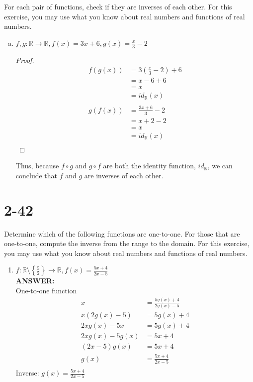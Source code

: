 \documentclass{article}
\newcommand{\R}{\mathbb{R}}
\begin{document}
For each pair of functions, check if they are inverses of each other.  For this
exercise, you may use what you know about real numbers and functions of real
numbers.

\begin{enumerate}[a)]
    \item $f, g : \R \to \R, f(x) = 3x + 6, g(x) = \frac{x}{3} - 2$
        \begin{proof}
            \begin{align*}
                f(g(x)) &= 3(\frac{x}{3} - 2) + 6 \\
                        &= x - 6 + 6 \\
                        &= x \\
                        &= id_\R(x) \\
                \\
                g(f(x)) &= \frac{3x + 6}{3} - 2 \\
                        &= x + 2 - 2 \\
                        &= x \\
                        &= id_\R(x) \\
            \end{align*}
        \end{proof}
        Thus, because $f \circ g$ and $g \circ f$ are both the identity
        function, $id_\R$, we can conclude that $f$ and $g$ are inverses of
        each other.
\end{enumerate}

\section{2-42}

Determine which of the following functions are one-to-one.  For those that are
one-to-one, compute the inverse from the range to the domain.  For this
exercise, you may use what you know about real numbers and functions of real
numbers.

\begin{enumerate}
    \item[c)] $f: \R \setminus \left\{\frac{5}{2}\right\} \to \R, f(x) =
        \frac{5x+4}{2x-5}$ \\
        \textbf{ANSWER:} \\
        One-to-one function \checkmark \\
        \begin{align*}
            x &= \frac{5g(x)+4}{2g(x)-5} \\
            x(2g(x)-5) &= 5g(x)+4 \\
            2xg(x) - 5x &= 5g(x) + 4 \\
            2xg(x) - 5g(x) &= 5x + 4 \\
            (2x - 5)g(x) &= 5x + 4 \\
            g(x) &= \frac{5x + 4}{2x - 5}\\
        \end{align*}
        Inverse: $g(x) = \frac{5x + 4}{2x - 5}$
\end{enumerate}
\end{document}
